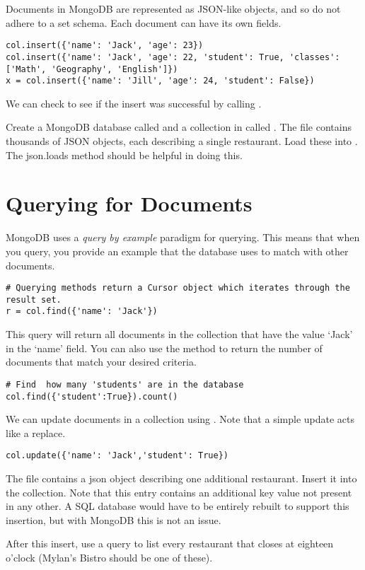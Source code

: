 Documents in MongoDB are represented as JSON-like objects, and so do not adhere to a set schema.  Each document can have its own fields.

\begin{lstlisting}
col.insert({'name': 'Jack', 'age': 23})
col.insert({'name': 'Jack', 'age': 22, 'student': True, 'classes': ['Math', 'Geography', 'English']})
x = col.insert({'name': 'Jill', 'age': 24, 'student': False})
\end{lstlisting}
We can check to see if the insert was successful by calling .


\begin{problem}
Create a MongoDB database called  and a collection in  called . The file  contains thousands of JSON objects, each describing a single restaurant. Load these into . The json.loads method should be helpful in doing this.
\end{problem}

\section*{Querying for Documents}
MongoDB uses a \emph{query by example} paradigm for querying.  This means that when you query, you provide an example that the database uses to match with other documents.
\begin{lstlisting}
# Querying methods return a Cursor object which iterates through the result set.
r = col.find({'name': 'Jack'})
\end{lstlisting}
This query will return all documents in the collection that have the value `Jack' in the `name' field.
You can also use the  method to return the number of documents that match your desired criteria.
\begin{lstlisting}
# Find  how many 'students' are in the database
col.find({'student':True}).count()
\end{lstlisting}

We can update documents in a collection using .  Note that a simple update acts like a replace.
\begin{lstlisting}
col.update({'name': 'Jack','student': True})
\end{lstlisting}

\begin{problem}
The file  contains a json object describing one additional restaurant.  Insert it into the collection. Note that this entry contains an additional key value not present in any other.  A SQL database would have to be entirely rebuilt to support this insertion, but with MongoDB this is not an issue.

After this insert, use a query to list every restaurant that closes at eighteen o'clock (Mylan's Bistro should be one of these).
\end{problem}

